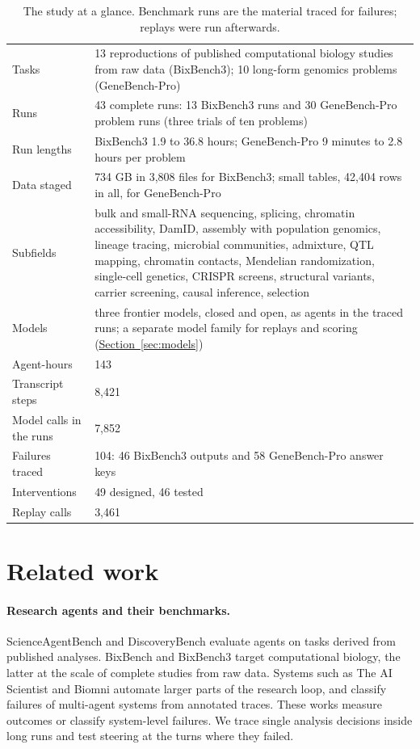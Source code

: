 \documentclass[10pt]{article}
\newcommand{\sref}[1]{\hyperref[#1]{Section~\ref*{#1}}}
\begin{document}
\begin{table}[t]
\centering\footnotesize
\caption{The study at a glance. Benchmark runs are the material traced for failures; replays were run afterwards.}
\label{tab:glance}
\begin{tabularx}{\textwidth}{@{}P{3.4cm}L@{}}
\toprule
Tasks & 13 reproductions of published computational biology studies from raw data (BixBench3); 10 long-form genomics problems
(GeneBench-Pro)\\
Runs & 43 complete runs: 13 BixBench3 runs and 30 GeneBench-Pro problem runs (three trials of ten problems)\\
Run lengths & BixBench3 1.9 to 36.8 hours; GeneBench-Pro 9 minutes to 2.8 hours per problem\\
Data staged & 734 GB in 3,808 files for BixBench3; small tables, 42,404 rows in all, for GeneBench-Pro\\
Subfields & bulk and small-RNA sequencing, splicing, chromatin accessibility, DamID, assembly with population genomics, lineage
tracing, microbial communities, admixture, QTL mapping, chromatin contacts, Mendelian randomization, single-cell genetics, CRISPR
screens, structural variants, carrier screening, causal inference, selection\\
Models & three frontier models, closed and open, as agents in the traced runs; a separate model family for replays and scoring
(\sref{sec:models})\\
Agent-hours & 143\\
Transcript steps & 8,421\\
Model calls in the runs & 7,852\\
Failures traced & 104: 46 BixBench3 outputs and 58 GeneBench-Pro answer keys\\
Interventions & 49 designed, 46 tested\\
Replay calls & 3,461\\
\bottomrule
\end{tabularx}
\end{table}

\section{Related work}\label{sec:related}

\paragraph{Research agents and their benchmarks.} ScienceAgentBench \citep{chen2025scienceagentbench} and DiscoveryBench
\citep{majumder2025discoverybench} evaluate agents on tasks derived from published analyses. BixBench \citep{mitchener2025bixbench}
and BixBench3 \citep{koch2026bixbench3} target computational biology, the latter at the scale of complete studies from raw data.
Systems such as The AI Scientist \citep{lu2024aiscientist} and Biomni \citep{huang2025biomni} automate larger parts of the research
loop, and \citet{cemri2025mast} classify failures of multi-agent systems from annotated traces. These works measure outcomes or
classify system-level failures. We trace single analysis decisions inside long runs and test steering at the turns where they failed.
\end{document}
